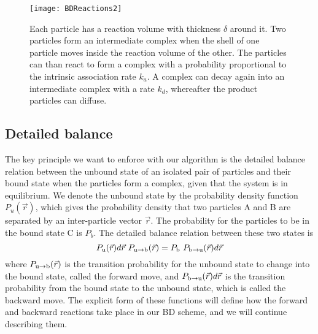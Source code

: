 \begin{figure}[hb]
\centering
\texttt{[image: BDReactions2]}
\caption{ Each particle has a reaction volume with thickness $\delta$ around it. Two particles form an intermediate complex when the shell of one particle moves inside the reaction volume of the other. The particles can than react to form a complex with a probability proportional to the intrinsic association rate $k_a$. A complex can decay again into an intermediate complex with a rate $k_d$, whereafter the product particles can diffuse.}
\end{figure}

\subsection{Detailed balance}

The key principle we want to enforce with our algorithm is the detailed balance relation between the unbound state of an isolated pair of particles and their bound state when the particles form a complex, given that the system is in equilibrium. We denote the unbound state by the probability density function $P_u(\vec{r})$, which gives the probability density that two particles A and B are separated by an inter-particle vector $\vec{r}$. The probability for the particles to be in the bound state C is $P_b$. The detailed balance relation between these two states is
\begin{equation}
 P_{ \rm{u} }(\vec{r})d\vec{r} \,\, P_{ \rm{u} \to \rm{b} }(\vec{r}) = P_{ \rm{b} } \,\, P_{ \rm{b} \to \rm{u} }(\vec{r})d\vec{r}
\elabel{DBeqn}
\end{equation}
where $P_{ \rm{u} \to \rm{b} }(\vec{r})$ is the transition probability for the unbound state to change into the bound state, called the forward move, and $P_{ \rm{b} \to \rm{u}}(\vec{r})d\vec{r}$ is the transition probability from the bound state to the unbound state, which is called the backward move. The explicit form of these functions will define how the forward and backward reactions take place in our BD scheme, and we will continue describing them. 

